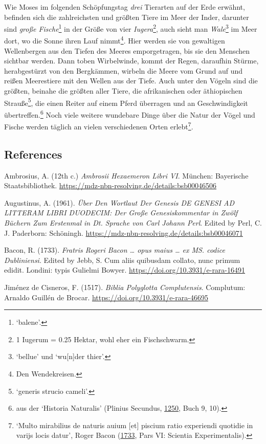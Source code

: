\documentclass[
]{article}
\begin{document}
Wie Moses im folgenden Schöpfungstag \emph{drei} Tierarten auf der Erde
erwähnt, befinden sich die zahlreichsten und größten Tiere im Meer der
Inder, darunter sind \emph{große Fische}\footnote{`balene'.} in der
Größe von vier \emph{Iugera}\footnote{1 Iugerum = 0.25 Hektar, wohl eher
  ein Fischschwarm.}, auch sieht man \emph{Wale}\footnote{`bellue' und
  `wu{[}n{]}der thier'.} im Meer dort, wo die Sonne ihren Lauf
nimmt\footnote{Den Wendekreisen.}. Hier werden sie von gewaltigen
Wellenbergen aus den Tiefen des Meeres emporgetragen, bis sie den
Menschen sichtbar werden. Dann toben Wirbelwinde, kommt der Regen,
daraufhin Stürme, herabgestürzt von den Bergkämmen, wirbeln die Meere
vom Grund auf und reißen Meerestiere mit den Wellen aus der Tiefe. Auch
unter den Vögeln sind die größten, beinahe die größten aller Tiere, die
afrikanischen oder äthiopischen Strauße\footnote{`generis strucio
  cameli'.}, die einen Reiter auf einem Pferd überragen und an
Geschwindigkeit übertreffen.\footnote{aus der `Historia Naturalis'
  (Plinius Secundus,
  \href{https://gallica.bnf.fr/ark:/12148/btv1b550140045/}{1250}, Buch
  9, 10).} Noch viele weitere wundebare Dinge über die Natur der Vögel
und Fische werden täglich an vielen verschiedenen Orten
erlebt\footnote{`Multo mirabilius de naturis auium {[}et{]} piscium
  ratio experiendi quotidie in varijs locis datur', Roger Bacon
  (\href{https://doi.org/10.3931/e-rara-16491}{1733}, Pars VI: Scientia
  Experimentalis).}.

\hypertarget{references}{%
\subsection{References}\label{references}}

Ambrosius, A. (12th c.) \emph{Ambrosii Hexaemeron Libri VI}. München:
Bayerische Staatsbibliothek.
\url{https://mdz-nbn-resolving.de/details:bsb00046506}

Augustinus, A. (1961). \emph{Über Den Wortlaut Der Genesis DE GENESI AD
LITTERAM LIBRI DUODECIM: Der Große Genesiskommentar in Zwölf Büchern Zum
Erstenmal in Dt. Sprache von Carl Johann Perl}. Edited by Perl, C. J.
Paderborn: Schöningh.
\url{https://mdz-nbn-resolving.de/details:bsb00046071}

Bacon, R. (1733). \emph{Fratris Rogeri Bacon \ldots{} opus maius
\ldots{} ex MS. codice Dubliniensi}. Edited by Jebb, S. Cum aliis
quibusdam collato, nunc primum edidit. Londini: typis Gulielmi Bowyer.
\url{https://doi.org/10.3931/e-rara-16491}

Jiménez de Cisneros, F. (1517). \emph{Biblia Polyglotta Complutensis}.
Complutum: Arnaldo Guillén de Brocar.
\url{https://doi.org/10.3931/e-rara-46695}
\end{document}
